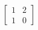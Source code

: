 \documentclass[preview]{standalone}
\begin{document}
\begin{center}
$\begin{bmatrix} 1 & 2 \\ 1 & 0 \end{bmatrix}$
\end{center}
\end{document}
